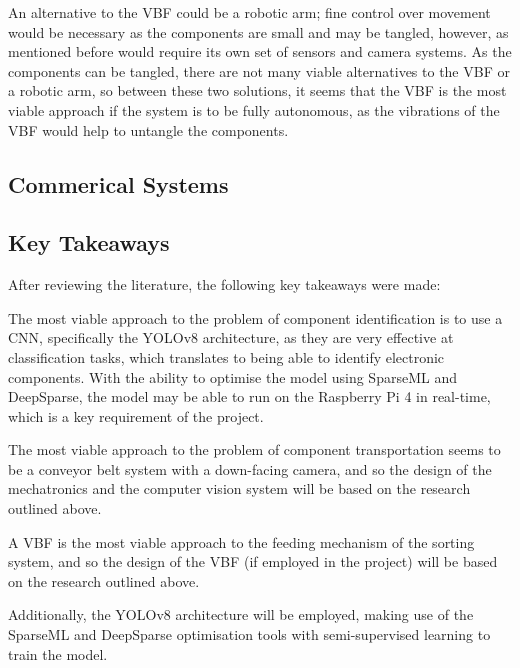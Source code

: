 An alternative to the VBF could be a robotic arm; fine control over movement would be necessary as the components are small and may be tangled, however, as mentioned before would require its own set of sensors and camera systems. As the components can be tangled, there are not many viable alternatives to the VBF or a robotic arm, so between these two solutions, it seems that the VBF is the most viable approach if the system is to be fully autonomous, as the vibrations of the VBF would help to untangle the components.

\subsection{Commerical Systems}
\subsection{Key Takeaways}
After reviewing the literature, the following key takeaways were made:

The most viable approach to the problem of component identification is to use a CNN, specifically the YOLOv8 architecture, as they are very effective at classification tasks, which translates to being able to identify electronic components. With the ability
to optimise the model using SparseML and DeepSparse, the model may be able to run on the Raspberry Pi 4 in real-time, which is a key requirement of the project.

The most viable approach to the problem of component transportation seems to be a conveyor belt system with a down-facing camera, and so the design of the mechatronics and the computer vision system will be based on the research outlined above.

A VBF is the most viable approach to the feeding mechanism of the sorting system, and so the design of the VBF (if employed in the project) will be based on the research outlined above.

Additionally, the YOLOv8 architecture will be employed, making use of the SparseML and DeepSparse optimisation tools with semi-supervised learning to train the model.
